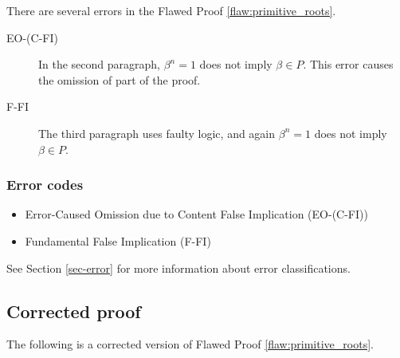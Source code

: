 There are several errors
 in the Flawed Proof \ref{flaw:primitive_roots}. %

 \begin{description}
    \item[EO-(C-FI)] In the second paragraph, $\beta^n = 1$ does not imply $\beta \in P$. This error causes the omission of part of the proof.
    \item[F-FI] The third paragraph uses faulty logic, and again $\beta^n = 1$ does not imply $\beta \in P$.
 	
 \end{description}


\subsubsection{Error codes}
\begin{itemize}
	\item Error-Caused Omission due to Content False Implication (EO-(C-FI))
	\item Fundamental False Implication (F-FI)
\end{itemize}
See Section \ref{sec-error} for more information about error classifications.

\clearpage
\subsection{Corrected proof}

The following is a corrected version of Flawed Proof \ref{flaw:primitive_roots}. %

